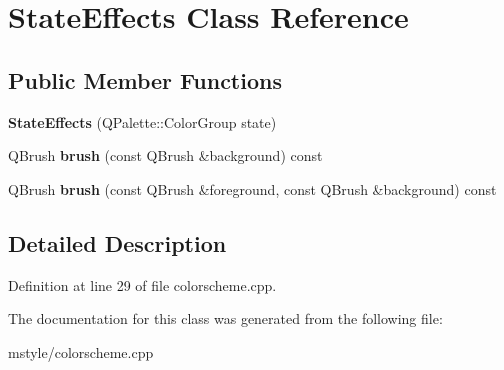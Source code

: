 \hypertarget{class_state_effects}{}\section{State\+Effects Class Reference}
\label{class_state_effects}
\subsection*{Public Member Functions}
\begin{DoxyCompactItemize}
\item 
\mbox{\label{class_state_effects_a14edb7c822826247ee1ea1377fa9a24d}} 
{\bfseries State\+Effects} (Q\+Palette\+::\+Color\+Group state)
\item 
\mbox{\label{class_state_effects_a7c4cf13319d2417b19dc85c5124b36fd}} 
Q\+Brush {\bfseries brush} (const Q\+Brush \&background) const
\item 
\mbox{\label{class_state_effects_aa8e33e61e4cf307884172376299a9599}} 
Q\+Brush {\bfseries brush} (const Q\+Brush \&foreground, const Q\+Brush \&background) const
\end{DoxyCompactItemize}


\subsection{Detailed Description}


Definition at line 29 of file colorscheme.\+cpp.



The documentation for this class was generated from the following file\+:\begin{DoxyCompactItemize}
\item 
mstyle/colorscheme.\+cpp\end{DoxyCompactItemize}
